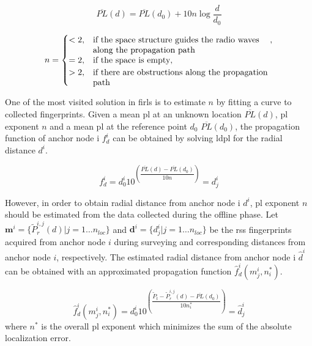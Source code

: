     \begin{equation}
        \label{eq:log-distance}
        \overline{PL}(d) = \overline{PL}(d_0) + 10 n \log{\dfrac{d}{d_0}}
    \end{equation}

    \begin{equation}
        n =
        \begin{cases}
            <2,& \parbox[t]{.6\textwidth}{if the space structure guides the radio waves\\
                                        along the propagation path}, \\
            =2,& \text{if the space is empty}, \\
            >2,& \parbox[t]{.6\textwidth}{if there are obstructions along the propagation\\
                                        path}
        \end{cases}
    \end{equation}

    One of the most visited solution in \gls{firl}s is to estimate $n$ by fitting a curve to collected fingerprints.
    Given a mean \gls{pl} at an unknown location $\overline{PL}(d)$, \gls{pl} exponent $n$ and a mean \gls{pl} at the reference point $d_0$ $\overline{PL}(d_0)$, the propagation function of anchor node i $f^i_{d}$ can be obtained by solving \gls{ldpl} for the radial distance $d^i$.

    \begin{equation}
      \label{eq:log-distance-d}
      f^i_{d} = d^i_0 10^{\left(\dfrac{\overline{PL}(d)-\overline{PL}(d_0)}{10 n} \right)} = d^i_j
    \end{equation}


    However, in order to obtain radial distance from anchor node i $d^i$, \gls{pl} exponent $n$ should be estimated from the data collected during the offline phase.
    Let $\bm{m}^i = \{\widetilde{P}_r^{i,j}(d) | j=1 \ldots n_{loc} \}$ and $\bm{d}^i = \{ d^i_j | j = 1 \ldots n_{loc}\}$ be the \gls{rss} fingerprints acquired from anchor node $i$ during surveying and corresponding distances from anchor node $i$, respectively.
    The estimated radial distance from anchor node i $\hat{d}^i$ can be obtained with an approximated propagation function $\hat{f}^i_d(m^i_j, n_i^*)$.

    \begin{equation}
      \label{eq:log-distance-d-app}
      \hat{f}^i_d(m^i_j, n_i^*) = d^i_0 10^{\left(\dfrac{\widetilde{P}_t - \widetilde{P}_r^{i,j}(d) - \overline{PL}(d_0)}{10 n_i^*} \right)} = \hat{d}^i_j
    \end{equation}
    where $n^*$ is the overall \gls{pl} exponent which minimizes the sum of the absolute localization error.

